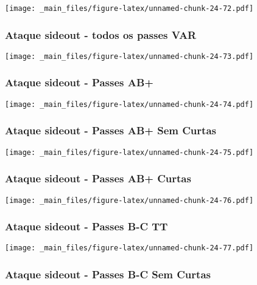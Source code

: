 \documentclass[
]{book}
\begin{document}
\texttt{[image: \_main\_files/figure-latex/unnamed-chunk-24-72.pdf]}

\subsubsection*{Ataque sideout - todos os passes VAR}\label{ataque-sideout---todos-os-passes-var-4}

\texttt{[image: \_main\_files/figure-latex/unnamed-chunk-24-73.pdf]}

\subsubsection{Ataque sideout - Passes AB+}\label{ataque-sideout---passes-ab-4}

\texttt{[image: \_main\_files/figure-latex/unnamed-chunk-24-74.pdf]}

\subsubsection*{Ataque sideout - Passes AB+ Sem Curtas}\label{ataque-sideout---passes-ab-sem-curtas-4}

\texttt{[image: \_main\_files/figure-latex/unnamed-chunk-24-75.pdf]}

\subsubsection*{Ataque sideout - Passes AB+ Curtas}\label{ataque-sideout---passes-ab-curtas-4}

\texttt{[image: \_main\_files/figure-latex/unnamed-chunk-24-76.pdf]}

\subsubsection{Ataque sideout - Passes B-C TT}\label{ataque-sideout---passes-b-c-tt-4}

\texttt{[image: \_main\_files/figure-latex/unnamed-chunk-24-77.pdf]}

\subsubsection*{Ataque sideout - Passes B-C Sem Curtas}\label{ataque-sideout---passes-b-c-sem-curtas-4}
\end{document}
